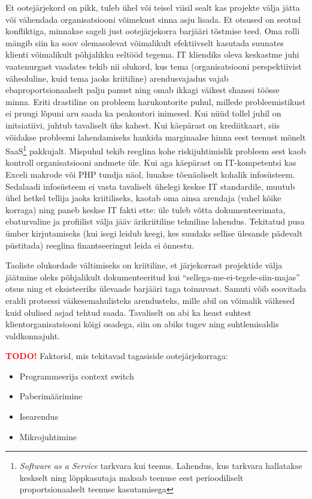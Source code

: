 \documentclass{tufte-book}
\newcommand{\TODO}{\textcolor{red}{\bf TODO!}\xspace}
\begin{document}
Et ootejärjekord on pikk, tuleb ühel või teisel viisil sealt kas projekte välja jätta või vähendada organisatsiooni võimekust sinna asju lisada. Et otsused on seotud konfliktiga, minnakse sageli just ootejärjekorra barjääri tõstmise teed. Oma rolli mängib siin ka soov olemasolevat võimalikult efektiivselt kasutada suunates klienti võimalikult põhjalikku eeltööd tegema. IT kliendiks oleva keskastme juhi vaatenurgast vaadates tekib nii olukord, kus tema (organisatsiooni perspektiivist väheoluline, kuid tema jaoks kriitiline) arendusvajadus vajab ebaproportsionaalselt palju panust ning omab ikkagi väikest shanssi töösse minna. Eriti drastiline on probleem harukontorite puhul, millede probleemistikust ei pruugi lõpuni aru saada ka peakontori inimesed. Kui nüüd tollel juhil on initsiatiivi, juhtub tavaliselt üks kahest. Kui käepärast on krediitkaart, siis võidakse probleemi lahendamiseks hankida marginaalse hinna eest teenust mõnelt SaaS\footnote{\emph{Software as a Service} tarkvara kui teenus. Lahendus, kus tarkvara hallatakse keskselt ning lõppkasutaja maksab teenuse eest perioodiliselt proportsionaalselt teenuse kasutamisega} pakkujalt. Mispuhul tekib reeglina kohe riskijuhtimislik probleem sest kaob kontroll organisatsiooni andmete üle. Kui aga käepärast on IT-kompetentsi kas Exceli makrode või PHP tundja näol, luuakse tõenäoliselt kohalik infosüsteem. Sedalaadi infosüsteem ei vasta tavaliselt ühelegi keskse IT standardile, muutub ühel hetkel tellija jaoks kriitiliseks, kaotab oma ainsa arendaja (vahel kõike korraga) ning paneb keskse IT fakti ette: üle tuleb võtta dokumenteerimata, ebaturvaline ja profiilist välja jääv ärikriitiline tehniline lahendus. Tekitatud pusa ümber kirjutamiseks (kui isegi leidub keegi, kes suudaks sellise ülesande pädevalt püstitada) reeglina finantseeringut leida ei õnnestu. 

Taoliste olukordade vältimiseks on kriitiline, et järjekorrast projektide välja jäätmine oleks põhjalikult dokumenteeritud kui \enquote{sellega-me-ei-tegele-siin-majas} otsus ning et eksisteeriks ülevaade barjääri taga toimuvast. Samuti võib soovitada eraldi protsessi väikesemahulisteks arendusteks, mille abil on võimalik väikesed kuid olulised asjad tehtud saada. Tavaliselt on abi ka heast suhtest klientorganisatsiooni kõigi osadega, siin on abiks tugev ning suhtlemisaldis valdkonnajuht.

\TODO Faktorid, mis tekitavad tagasiside ootejärjekorraga:
\begin{itemize}
	\item Programmeerija context switch
	\item Paberimäärimine
	\item Isearendus
	\item Mikrojuhtimine
\end{itemize}
\end{document}
